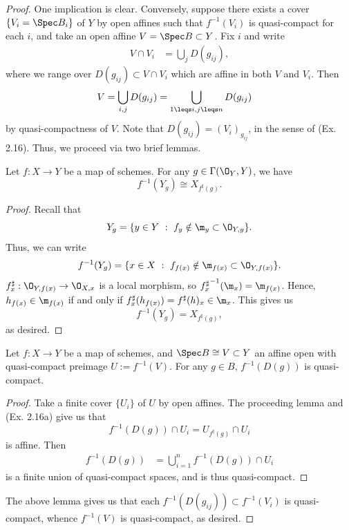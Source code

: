 \documentclass[12pt]{amsart}
\begin{document}
 \begin{proof}
   One implication is clear.
   Conversely, suppose there exists a cover $\{V_i=\Spec B_i\}$ of $Y$ by open affines such that $f^{-1}(V_i)$ is quasi-compact for each $i$, and take an open affine $V=\Spec B\subset Y$.
   Fix $i$ and write 
   \begin{align*}
     V\cap V_i&= \bigcup_j D(g_{ij}),
   \end{align*}
   where we range over $D(g_{ij})\subset V\cap V_i$ which are affine in both $V$ and $V_i$.
   Then
   \begin{align*}
     V&= \bigcup_{i,j}D(g_{ij}) = \bigcup_{1\leqs i,j\leqs n}D(g_{ij})
   \end{align*}
   by quasi-compactness of $V$.
   Note that $D(g_{ij})=(V_i)_{g_{ij}}$, in the sense of (Ex. 2.16).
   Thus, we proceed via two brief lemmas.

   \begin{lemma}
     Let $f:X\to Y$ be a map of schemes.
     For any $g\in \Gamma(\O_Y,Y)$, we have
     \[
       f^{-1}(Y_g)\cong X_{f^\sharp(g)}.
     \] 
   \end{lemma}

   \begin{proof}
     Recall that
     \[
       Y_g = \{y\in Y~:~ f_y\notin \m_y\subset \O_{Y,y}\}.
     \] 
     Thus, we can write
     \[
       f^{-1}(Y_g) = \{x\in X ~:~f_{f(x)}\notin \m_{f(x)}\subset \O_{Y,f(x)}\}.
     \] 
     $f^\sharp_x:\O_{Y,f(x)}\to \O_{X,x}$ is a local morphism, so ${f^\sharp_x}^{-1}(\m_x)=\m_{f(x)}$.
     Hence, $h_{f(x)}\in \m_{f(x)}$ if and only if $f^\sharp_x(h_{f(x)})=f^\sharp(h)_x\in \m_x$.
     This gives us
     \[
       f^{-1}(Y_g)=X_{f^\sharp(g)},
     \] 
     as desired.
   \end{proof}

   \begin{lemma}
     Let $f:X\to Y$ be a map of schemes, and $\Spec B\cong V\subset Y$ an affine open with quasi-compact preimage $U:=f^{-1}(V)$.
     For any $g\in B$, $f^{-1}(D(g))$ is quasi-compact.
   \end{lemma}

   \begin{proof}
     Take a finite cover $\{U_i\}$ of $U$ by open affines.
     The proceeding lemma and (Ex. 2.16a) give us that
     \[
       f^{-1}(D(g))\cap U_i = U_{f^\sharp(g)}\cap U_i
     \] 
     is affine.
     Then 
     \begin{align*}
       f^{-1}(D(g)) &= \bigcup_{i=1}^n f^{-1}(D(g))\cap U_i
     \end{align*}
     is a finite union of quasi-compact spaces, and is thus quasi-compact.
   \end{proof}
   
   The above lemma gives us that each $f^{-1}(D(g_{ij}))\subset f^{-1}(V_i)$ is quasi-compact, whence $f^{-1}(V)$ is quasi-compact, as desired.
 \end{proof}
 
\end{document}
